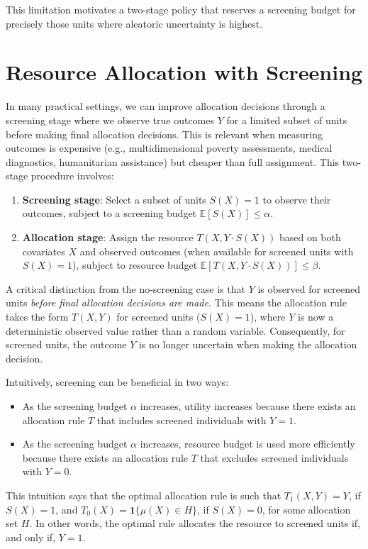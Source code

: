 This limitation motivates a two-stage policy that reserves a screening budget for precisely those units where aleatoric uncertainty is highest.

\section{Resource Allocation with Screening}
        
In many practical settings, we can improve allocation decisions through a screening stage where we observe true outcomes $Y$ for a limited subset of units before making final allocation decisions. This is relevant when measuring outcomes is expensive (e.g., multidimensional poverty assessments, medical diagnostics, humanitarian assistance) but cheaper than full assignment. This two-stage procedure involves:

\begin{enumerate}
\item \textbf{Screening stage}: Select a subset of units $S(X) = 1$ to observe their outcomes, subject to a screening budget $\mathbb{E}[S(X)] \leq \alpha$.
\item \textbf{Allocation stage}: Assign the resource $T(X, Y \cdot S(X))$ based on both covariates $X$ and observed outcomes (when available for screened units with $S(X) = 1$), subject to  resource budget $\mathbb{E}[T(X, Y \cdot S(X))] \leq \beta$.
\end{enumerate}

A critical distinction from the no-screening case is that $Y$ is observed for screened units \textit{before final allocation decisions are made}. This means the allocation rule takes the form $T(X,Y)$ for screened units ($S(X) = 1$), where $Y$ is now a deterministic observed value rather than a random variable. Consequently, for screened units, the outcome $Y$ is no longer uncertain when making the allocation decision.


Intuitively, screening can be beneficial in two ways:
\begin{itemize}
    \item As the screening budget $\alpha$ increases, utility increases because there exists an allocation rule $T$ that includes screened individuals with $Y=1$. 
    \item As the screening budget $\alpha$ increases, resource budget is used more efficiently because there exists an allocation rule $T$ that excludes screened individuals with $Y=0$.
\end{itemize}
This intuition says that the optimal allocation rule is such that $T_1(X,Y) = Y$, if  $S(X)=1$, and $T_0(X) = \mathbf{1}\{\mu(X) \in H\}$,  if  $S(X) = 0$, for some allocation set $H$. In other words, the optimal rule allocates the resource to screened units if, and only if, $Y = 1$. 

